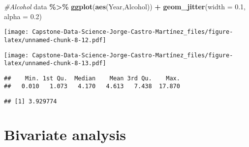 \documentclass[
]{article}
\newenvironment{Shaded}{\begin{snugshade}}{\end{snugshade}}
\newcommand{\AttributeTok}[1]{\textcolor[rgb]{0.13,0.29,0.53}{#1}}
\newcommand{\CommentTok}[1]{\textcolor[rgb]{0.56,0.35,0.01}{\textit{#1}}}
\newcommand{\FloatTok}[1]{\textcolor[rgb]{0.00,0.00,0.81}{#1}}
\newcommand{\FunctionTok}[1]{\textcolor[rgb]{0.13,0.29,0.53}{\textbf{#1}}}
\newcommand{\NormalTok}[1]{#1}
\newcommand{\SpecialCharTok}[1]{\textcolor[rgb]{0.81,0.36,0.00}{\textbf{#1}}}
\begin{document}
\begin{Shaded}
\begin{Highlighting}[]
\CommentTok{\#Alcohol}
\NormalTok{data  }\SpecialCharTok{\%\textgreater{}\%} \FunctionTok{ggplot}\NormalTok{(}\FunctionTok{aes}\NormalTok{(Year,Alcohol)) }\SpecialCharTok{+} \FunctionTok{geom\_jitter}\NormalTok{(}\AttributeTok{width =} \FloatTok{0.1}\NormalTok{, }\AttributeTok{alpha =} \FloatTok{0.2}\NormalTok{)}
\end{Highlighting}
\end{Shaded}

\texttt{[image: Capstone-Data-Science-Jorge-Castro-Martínez\_files/figure-latex/unnamed-chunk-8-12.pdf]}

\begin{Shaded}
\end{Shaded}

\texttt{[image: Capstone-Data-Science-Jorge-Castro-Martínez\_files/figure-latex/unnamed-chunk-8-13.pdf]}

\begin{Shaded}
\end{Shaded}

\begin{verbatim}
##    Min. 1st Qu.  Median    Mean 3rd Qu.    Max. 
##   0.010   1.073   4.170   4.613   7.438  17.870
\end{verbatim}

\begin{Shaded}
\end{Shaded}

\begin{verbatim}
## [1] 3.929774
\end{verbatim}

\section{Bivariate analysis}\label{bivariate-analysis}
\end{document}
